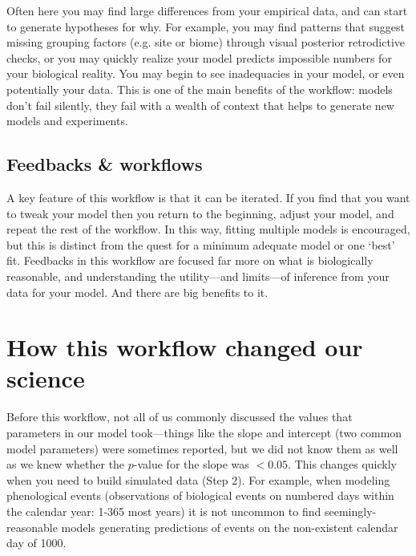 \documentclass[11pt]{article}
\begin{document}
Often here you may find large differences from your empirical data, and can start to generate hypotheses for why. For example, you may find patterns that suggest missing grouping factors (e.g. site or biome) through visual posterior retrodictive checks, or you may quickly realize your model predicts impossible numbers for your biological reality. You may begin to see inadequacies in your model, or even potentially your data.  This is one of the main benefits of the workflow: models don't fail silently, they fail with a wealth of context that helps to generate new models and experiments.

\subsection*{Feedbacks \& workflows}
A key feature of this workflow is that it can be iterated.  If you find that you want to tweak your model then you return to the beginning, adjust your model, and repeat the rest of the workflow. In this way, fitting multiple models is encouraged, but this is distinct from the quest for a minimum adequate model or one `best' fit. Feedbacks in this workflow are focused far more on what is biologically reasonable, and understanding the utility---and limits---of inference from your data for your model.  And there are big benefits to it. 


\section*{How this workflow changed our science} 
Before this workflow, not all of us commonly discussed the values that parameters in our model took---things like the slope and intercept (two common model parameters) were sometimes reported, but we did not know them as well as we knew whether the $p$-value for the slope was $<0.05$. This changes quickly when you need to build simulated data (Step 2). For example, when modeling phenological events (observations of biological events on numbered days within the calendar year: 1-365 most years) it is not uncommon to find seemingly-reasonable models generating predictions of events on the non-existent calendar day of 1000. %
\end{document}
